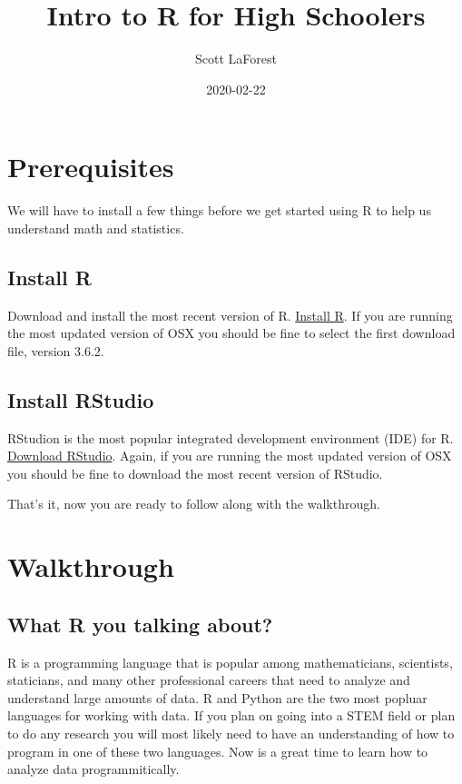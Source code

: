 \documentclass[]{book}
\title{Intro to R for High Schoolers}
\author{Scott LaForest}
\date{2020-02-22}
\begin{document}
\maketitle

{
\setcounter{tocdepth}{1}
\tableofcontents
}
\chapter{Prerequisites}\label{prerequisites}

We will have to install a few things before we get started using R to
help us understand math and statistics.

\section{Install R}\label{install-r}

Download and install the most recent version of R.
\href{https://cran.rstudio.com/}{Install R}. If you are running the most
updated version of OSX you should be fine to select the first download
file, version 3.6.2.

\section{Install RStudio}\label{install-rstudio}

RStudion is the most popular integrated development environment (IDE)
for R.
\href{https://rstudio.com/products/rstudio/download/\#download}{Download
RStudio}. Again, if you are running the most updated version of OSX you
should be fine to download the most recent version of RStudio.

That's it, now you are ready to follow along with the walkthrough.

\chapter{Walkthrough}\label{walkthrough}

\section{What R you talking about?}\label{what-r-you-talking-about}

R is a programming language that is popular among mathematicians,
scientists, staticians, and many other professional careers that need to
analyze and understand large amounts of data. R and Python are the two
most popluar languages for working with data. If you plan on going into
a STEM field or plan to do any research you will most likely need to
have an understanding of how to program in one of these two languages.
Now is a great time to learn how to analyze data programmitically.
\end{document}
